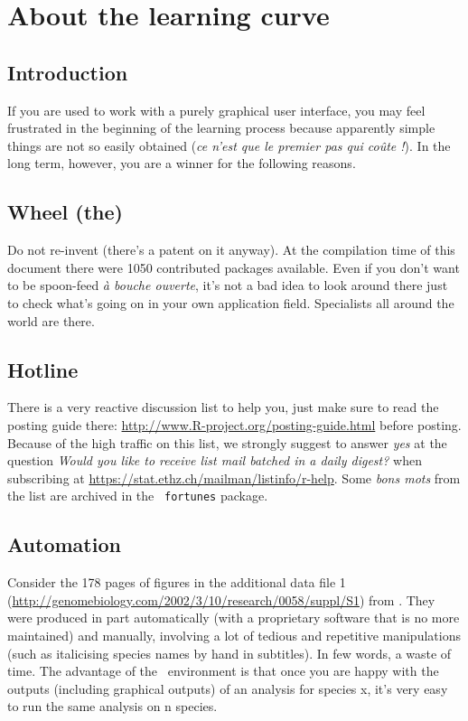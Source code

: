 \documentclass{article}
\begin{document}
\section{About the learning curve}

\subsection*{Introduction}

If you are used to work with a purely graphical user interface, you may feel frustrated in the
beginning of the learning process because apparently simple things are not so easily
obtained (\textit{ce n'est que le premier pas qui co{\^{u}te} !}).
In the long term, however, you are a winner for the following reasons.

\subsection{Wheel (the)}

Do not re-invent (there's a patent \cite{wheel} on it anyway).
At the compilation time of this document there were 
1050
contributed packages available. Even if you don't want to be spoon-feed 
\textit{{\`a} bouche ouverte}, 
it's not a bad
idea to look around there just to check what's going on in your own application field.
Specialists all around the world are there.

\subsection{Hotline}

There is a very reactive discussion list to help you, just make sure to
read the posting guide there: \url{http://www.R-project.org/posting-guide.html}
before posting. Because of the high traffic on this list, we strongly suggest to answer \emph{yes} at the
question \emph{Would you like to receive list mail batched in a daily  digest?} when
subscribing at \url{https://stat.ethz.ch/mailman/listinfo/r-help}. Some \textit{bons mots}
from the list are archived in the \Rlogo{}~\texttt{fortunes} package.

\subsection{Automation} 
Consider the 178 pages of figures in the additional data file 1
(\url{http://genomebiology.com/2002/3/10/research/0058/suppl/S1}) from \cite{lobrysueoka}. 
They were produced in part automatically (with a proprietary
software that is no more maintained) and manually, involving a lot of
tedious and repetitive manipulations (such as italicising species names by hand in subtitles).
In few words, a waste of time. The advantage of the \Rlogo{}~environment is that once you are
happy with the outputs (including graphical outputs) of an analysis for species x, it's very
easy to run the same analysis on n species. 
\end{document}
